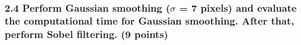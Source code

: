 \documentclass[11pt]{article}
\begin{document}
    \begin{center}
    \end{center}
    { \hspace*{\fill} \\}
    
    \subsubsection{\texorpdfstring{2.4 Perform Gaussian smoothing
(\(\sigma\) = 7 pixels) and evaluate the computational time for Gaussian
smoothing. After that, perform Sobel filtering. (9
points)}{2.4 Perform Gaussian smoothing (\textbackslash{}sigma = 7 pixels) and evaluate the computational time for Gaussian smoothing. After that, perform Sobel filtering. (9 points)}}\label{perform-gaussian-smoothing-sigma-7-pixels-and-evaluate-the-computational-time-for-gaussian-smoothing.-after-that-perform-sobel-filtering.-9-points}
\end{document}
